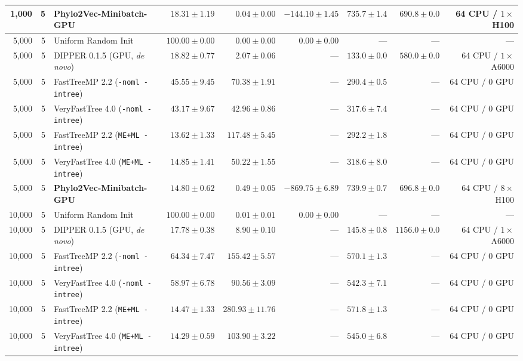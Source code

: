 \begin{table}[tbp]
\begin{tabular}{@{}rrlrrrrrr@{}}
1,000 & 5 & \textbf{Phylo2Vec-Minibatch-GPU} & $18.31 \pm 1.19$ & $\mathbf{0.04 \pm 0.00}$ & $\mathbf{-144.10 \pm 1.45}$ & $735.7 \pm 1.4$ & $690.8 \pm 0.0$ & 64 CPU / $1\times$ H100\\
\midrule
5,000 & 5 & Uniform Random Init & $100.00 \pm 0.00$ & $0.00 \pm 0.00$ & $0.00 \pm 0.00$ & --- & --- & ---\\
5,000 & 5 & DIPPER 0.1.5 (GPU, \textit{de novo}) & $18.82 \pm 0.77$ & $2.07 \pm 0.06$ & --- & $133.0 \pm 0.0$ & $580.0 \pm 0.0$ & 64 CPU / $1\times$ A6000\\
5,000 & 5 & FastTreeMP 2.2 (\texttt{-noml -intree}) & $45.55 \pm 9.45$ & $70.38 \pm 1.91$ & --- & $290.4 \pm 0.5$ & --- & 64 CPU / 0 GPU\\
5,000 & 5 & VeryFastTree 4.0 (\texttt{-noml -intree}) & $43.17 \pm 9.67$ & $42.96 \pm 0.86$ & --- & $317.6 \pm 7.4$ & --- & 64 CPU / 0 GPU\\
5,000 & 5 & FastTreeMP 2.2 (\texttt{ME+ML -intree}) & $\mathbf{13.62 \pm 1.33}$ & $117.48 \pm 5.45$ & --- & $292.2 \pm 1.8$ & --- & 64 CPU / 0 GPU\\
5,000 & 5 & VeryFastTree 4.0 (\texttt{ME+ML -intree}) & $14.85 \pm 1.41$ & $50.22 \pm 1.55$ & --- & $318.6 \pm 8.0$ & --- & 64 CPU / 0 GPU\\
5,000 & 5 & \textbf{Phylo2Vec-Minibatch-GPU} & $14.80 \pm 0.62$ & $\mathbf{0.49 \pm 0.05}$ & $\mathbf{-869.75 \pm 6.89}$ & $739.9 \pm 0.7$ & $696.8 \pm 0.0$ & 64 CPU / $8\times$ H100\\
\midrule
10,000 & 5 & Uniform Random Init & $100.00 \pm 0.00$ & $0.01 \pm 0.01$ & $0.00 \pm 0.00$ & --- & --- & ---\\
10,000 & 5 & DIPPER 0.1.5 (GPU, \textit{de novo}) & $17.78 \pm 0.38$ & $8.90 \pm 0.10$ & --- & $145.8 \pm 0.8$ & $1156.0 \pm 0.0$ & 64 CPU / $1\times$ A6000\\
10,000 & 5 & FastTreeMP 2.2 (\texttt{-noml -intree}) & $64.34 \pm 7.47$ & $155.42 \pm 5.57$ & --- & $570.1 \pm 1.3$ & --- & 64 CPU / 0 GPU\\
10,000 & 5 & VeryFastTree 4.0 (\texttt{-noml -intree}) & $58.97 \pm 6.78$ & $90.56 \pm 3.09$ & --- & $542.3 \pm 7.1$ & --- & 64 CPU / 0 GPU\\
10,000 & 5 & FastTreeMP 2.2 (\texttt{ME+ML -intree}) & $14.47 \pm 1.33$ & $280.93 \pm 11.76$ & --- & $571.8 \pm 1.3$ & --- & 64 CPU / 0 GPU\\
10,000 & 5 & VeryFastTree 4.0 (\texttt{ME+ML -intree}) & $14.29 \pm 0.59$ & $103.90 \pm 3.22$ & --- & $545.0 \pm 6.8$ & --- & 64 CPU / 0 GPU\\

\end{tabular}
\end{table}
